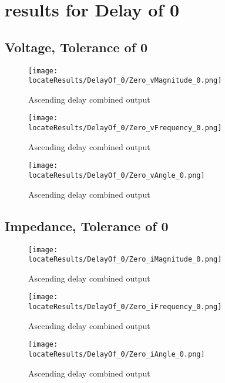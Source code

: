 \newpage
\section{results for Delay of 0}

\subsection{Voltage, Tolerance of 0}
\begin{figure}[hb]
    \texttt{[image: \\locateResults/DelayOf\_0/Zero\_vMagnitude\_0.png]}    
    \caption{Ascending delay combined output}
    \label{fig:PMUsim_Zero_iAngle_0}
\end{figure}

\begin{figure}[hb]
    \texttt{[image: \\locateResults/DelayOf\_0/Zero\_vFrequency\_0.png]}    
    \caption{Ascending delay combined output}
    \label{fig:PMUsim_Zero_iAngle_0}
\end{figure}

\begin{figure}[hb]
    \texttt{[image: \\locateResults/DelayOf\_0/Zero\_vAngle\_0.png]}    
    \caption{Ascending delay combined output}
    \label{fig:PMUsim_Zero_iAngle_0}
\end{figure}


\subsection{Impedance, Tolerance of 0}
\begin{figure}[hb]
    \texttt{[image: \\locateResults/DelayOf\_0/Zero\_iMagnitude\_0.png]}    
    \caption{Ascending delay combined output}
    \label{fig:PMUsim_Zero_iAngle_0}
\end{figure}

\begin{figure}[hb]
    \texttt{[image: \\locateResults/DelayOf\_0/Zero\_iFrequency\_0.png]}    
    \caption{Ascending delay combined output}
    \label{fig:PMUsim_Zero_iAngle_0}
\end{figure}

\begin{figure}[hb]
    \texttt{[image: \\locateResults/DelayOf\_0/Zero\_iAngle\_0.png]}    
    \caption{Ascending delay combined output}
    \label{fig:PMUsim_Zero_iAngle_0}
\end{figure}


